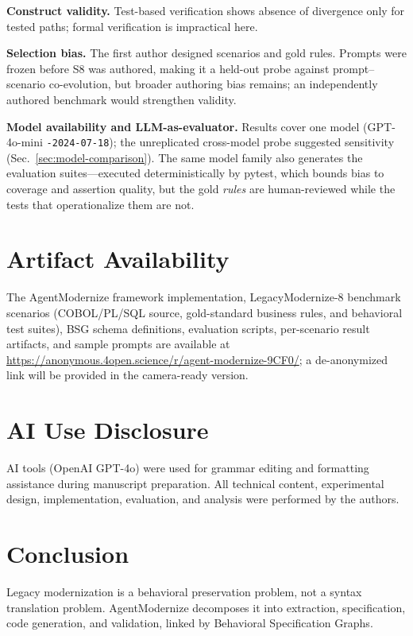 \documentclass[conference]{IEEEtran}
\begin{document}
\textbf{Construct validity.} Test-based verification shows absence of divergence only for tested paths; formal verification is impractical here.

\textbf{Selection bias.} The first author designed scenarios and gold rules. Prompts were frozen before S8 was authored, making it a held-out probe against prompt--scenario co-evolution, but broader authoring bias remains; an independently authored benchmark would strengthen validity.

\textbf{Model availability and LLM-as-evaluator.} Results cover one model (GPT-4o-mini \texttt{-2024-07-18}); the unreplicated cross-model probe suggested sensitivity (Sec.~\ref{sec:model-comparison}). The same model family also generates the evaluation suites---executed deterministically by pytest, which bounds bias to coverage and assertion quality, but the gold \emph{rules} are human-reviewed while the tests that operationalize them are not.

\section{Artifact Availability}

The AgentModernize framework implementation, LegacyModernize-8 benchmark scenarios (COBOL/PL/SQL source, gold-standard business rules, and behavioral test suites), BSG schema definitions, evaluation scripts, per-scenario result artifacts, and sample prompts are available at \url{https://anonymous.4open.science/r/agent-modernize-9CF0/}; a de-anonymized link will be provided in the camera-ready version.

\section{AI Use Disclosure}

AI tools (OpenAI GPT-4o) were used for grammar editing and formatting assistance during manuscript preparation. All technical content, experimental design, implementation, evaluation, and analysis were performed by the authors.

\section{Conclusion}

Legacy modernization is a behavioral preservation problem, not a syntax translation problem. AgentModernize decomposes it into extraction, specification, code generation, and validation, linked by Behavioral Specification Graphs.
\end{document}
